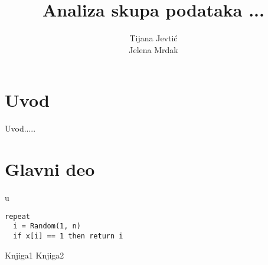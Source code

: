 \documentclass[12pt,a4paper]{article}
\title{Analiza skupa podataka ...}
\author{Tijana Jevti\' c \\ Jelena Mrdak}
\begin{document}
\maketitle

\tableofcontents

\section{Uvod}
Uvod.....

\section{Glavni deo}
u \cite{knjiga1}

\begin{lstlisting}[mathescape=true]
repeat
  i = Random(1, n)
  if x[i] == 1 then return i
\end{lstlisting}


\begin{thebibliography}{9}
  Knjiga1
  Knjiga2
\end{thebibliography}
\end{document}
